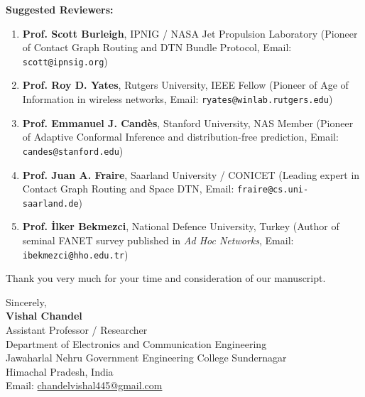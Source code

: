 \documentclass[11pt,a4paper]{article}
\begin{document}
\vspace{0.8em}
\noindent
\textbf{Suggested Reviewers:}
\begin{enumerate}
    \item \textbf{Prof. Scott Burleigh}, IPNIG / NASA Jet Propulsion Laboratory (Pioneer of Contact Graph Routing and DTN Bundle Protocol, Email: \texttt{scott@ipnsig.org})
    \item \textbf{Prof. Roy D. Yates}, Rutgers University, IEEE Fellow (Pioneer of Age of Information in wireless networks, Email: \texttt{ryates@winlab.rutgers.edu})
    \item \textbf{Prof. Emmanuel J. Cand\`es}, Stanford University, NAS Member (Pioneer of Adaptive Conformal Inference and distribution-free prediction, Email: \texttt{candes@stanford.edu})
    \item \textbf{Prof. Juan A. Fraire}, Saarland University / CONICET (Leading expert in Contact Graph Routing and Space DTN, Email: \texttt{fraire@cs.uni-saarland.de})
    \item \textbf{Prof. \.Ilker Bekmezci}, National Defence University, Turkey (Author of seminal FANET survey published in \textit{Ad Hoc Networks}, Email: \texttt{ibekmezci@hho.edu.tr})
\end{enumerate}

\vspace{1.5em}
\noindent
Thank you very much for your time and consideration of our manuscript.

\vspace{1.5em}
\noindent
Sincerely,\\
\textbf{Vishal Chandel}\\
Assistant Professor / Researcher\\
Department of Electronics and Communication Engineering\\
Jawaharlal Nehru Government Engineering College Sundernagar\\
Himachal Pradesh, India\\
Email: \href{mailto:chandelvishal445@gmail.com}{chandelvishal445@gmail.com}
\end{document}
